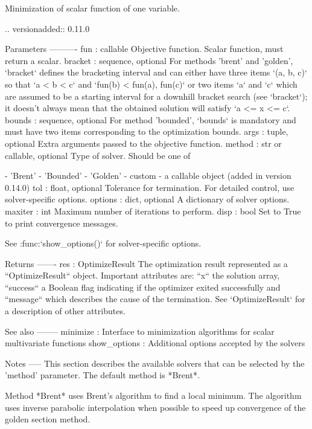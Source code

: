 \begin{DoxyVerb}Minimization of scalar function of one variable.

.. versionadded:: 0.11.0

Parameters
----------
fun : callable
    Objective function.
    Scalar function, must return a scalar.
bracket : sequence, optional
    For methods 'brent' and 'golden', `bracket` defines the bracketing
    interval and can either have three items `(a, b, c)` so that `a < b
    < c` and `fun(b) < fun(a), fun(c)` or two items `a` and `c` which
    are assumed to be a starting interval for a downhill bracket search
    (see `bracket`); it doesn't always mean that the obtained solution
    will satisfy `a <= x <= c`.
bounds : sequence, optional
    For method 'bounded', `bounds` is mandatory and must have two items
    corresponding to the optimization bounds.
args : tuple, optional
    Extra arguments passed to the objective function.
method : str or callable, optional
    Type of solver.  Should be one of

        - 'Brent'
        - 'Bounded'
        - 'Golden'
        - custom - a callable object (added in version 0.14.0)
tol : float, optional
    Tolerance for termination. For detailed control, use solver-specific
    options.
options : dict, optional
    A dictionary of solver options.
        maxiter : int
            Maximum number of iterations to perform.
        disp : bool
            Set to True to print convergence messages.

    See :func:`show_options()` for solver-specific options.

Returns
-------
res : OptimizeResult
    The optimization result represented as a ``OptimizeResult`` object.
    Important attributes are: ``x`` the solution array, ``success`` a
    Boolean flag indicating if the optimizer exited successfully and
    ``message`` which describes the cause of the termination. See
    `OptimizeResult` for a description of other attributes.

See also
--------
minimize : Interface to minimization algorithms for scalar multivariate
    functions
show_options : Additional options accepted by the solvers

Notes
-----
This section describes the available solvers that can be selected by the
'method' parameter. The default method is *Brent*.

Method *Brent* uses Brent's algorithm to find a local minimum.
The algorithm uses inverse parabolic interpolation when possible to
speed up convergence of the golden section method.


\end{DoxyVerb}
